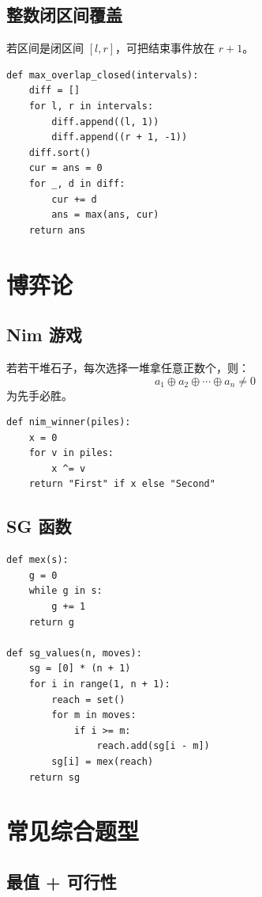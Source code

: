 \documentclass[UTF8,a4paper,14pt]{ctexart}
\begin{document}
\subsection{整数闭区间覆盖}

若区间是闭区间 $[l,r]$，可把结束事件放在 $r+1$。

\begin{lstlisting}
def max_overlap_closed(intervals):
    diff = []
    for l, r in intervals:
        diff.append((l, 1))
        diff.append((r + 1, -1))
    diff.sort()
    cur = ans = 0
    for _, d in diff:
        cur += d
        ans = max(ans, cur)
    return ans
\end{lstlisting}

\section{博弈论}

\subsection{Nim 游戏}

若若干堆石子，每次选择一堆拿任意正数个，则：
\[
a_1 \oplus a_2 \oplus \cdots \oplus a_n \ne 0
\]
为先手必胜。

\begin{lstlisting}
def nim_winner(piles):
    x = 0
    for v in piles:
        x ^= v
    return "First" if x else "Second"
\end{lstlisting}

\subsection{SG 函数}

\begin{lstlisting}
def mex(s):
    g = 0
    while g in s:
        g += 1
    return g

def sg_values(n, moves):
    sg = [0] * (n + 1)
    for i in range(1, n + 1):
        reach = set()
        for m in moves:
            if i >= m:
                reach.add(sg[i - m])
        sg[i] = mex(reach)
    return sg
\end{lstlisting}

\section{常见综合题型}

\subsection{最值 + 可行性}
\end{document}
